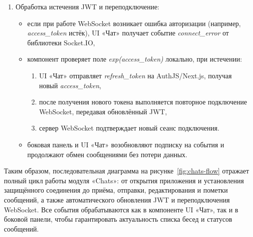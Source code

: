 \begin{enumerate}
    \item Обработка истечения JWT и переподключение:
    \begin{itemize}
        \item если при работе WebSocket возникает ошибка авторизации (например, \textit{access\_token} истёк), UI «Чат» получает событие \textit{connect\_error} от библиотеки Socket.IO,
        \item компонент проверяет поле \textit{exp(access\_token)} локально, при истечении:
        \begin{enumerate}
            \item UI «Чат» отправляет \textit{refresh\_token} на AuthJS/Next.js, получая новый \textit{access\_token},
            \item после получения нового токена выполняется повторное подключение WebSocket, передавая обновлённый JWT,
            \item сервер WebSocket подтверждает новый сеанс подключения.
        \end{enumerate}
        \item боковая панель и UI «Чат» возобновляют подписку на события и продолжают обмен сообщениями без потери данных.
    \end{itemize}
\end{enumerate}

Таким образом, последовательная диаграмма на рисунке~\ref{fig:chats-flow} отражает полный цикл работы модуля «Chats»: от открытия приложения и установления защищённого соединения до приёма, отправки, редактирования и пометки сообщений, а также автоматического обновления JWT и переподключения WebSocket. Все события обрабатываются как в компоненте UI «Чат», так и в боковой панели, чтобы гарантировать актуальность списка бесед и статусов сообщений.
